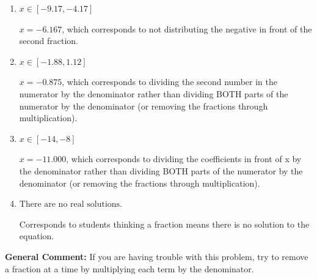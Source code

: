 \documentclass{extbook}[14pt]
\begin{document}
\begin{enumerate}
{\begin{enumerate}[label=\Alph*.]
* $x = -3.500$, which is the correct option.
\item \( x \in [-9.17, -4.17] \)

 $x = -6.167$, which corresponds to not distributing the negative in front of the second fraction.
\item \( x \in [-1.88, 1.12] \)

 $x = -0.875$, which corresponds to dividing the second number in the numerator by the denominator rather than dividing BOTH parts of the numerator by the denominator (or removing the fractions through multiplication).
\item \( x \in [-14, -8] \)

 $x = -11.000$, which corresponds to dividing the coefficients in front of x by the denominator rather than dividing BOTH parts of the numerator by the denominator (or removing the fractions through multiplication).
\item \( \text{There are no real solutions.} \)

Corresponds to students thinking a fraction means there is no solution to the equation.
\end{enumerate}

\textbf{General Comment:} If you are having trouble with this problem, try to remove a fraction at a time by multiplying each term by the denominator.
}
\end{enumerate}
\end{document}
